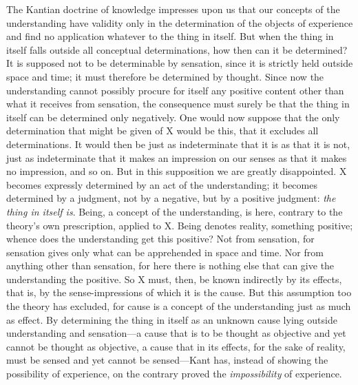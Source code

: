 \documentclass[12pt]{article}
\begin{document}
The Kantian doctrine of knowledge impresses upon us that our concepts of
the understanding have validity only in the determination of the objects of
experience and find no application whatever to the thing in itself. But
when the thing in itself falls outside all conceptual determinations, how
then can it be determined? It is supposed not to be determinable by
sensation, since it is strictly held outside space and time; it must
therefore be determined by thought. Since now the understanding cannot
possibly procure for itself any positive content other than what it
receives from sensation, the consequence must surely be that the thing in
itself can be determined only negatively. One would now suppose that the
only determination that might be given of X would be this, that it excludes
all determinations. It would then be just as indeterminate that it is as
that it is not, just as indeterminate that it makes an impression on our
senses as that it makes no impression, and so on. But in this supposition
we are greatly disappointed. X becomes expressly determined by an act of
the understanding; it becomes determined by a judgment, not by a negative,
but by a positive judgment: \emph{the thing in itself is}. Being, a concept
of the understanding, is here,
contrary to the theory's own prescription, applied to X. Being denotes
reality, something positive; whence does the understanding get this
positive? Not from sensation, for sensation gives only what can be
apprehended in space and time. Nor from anything other than sensation, for
here there is nothing else that can give the understanding the positive. So
X must, then, be known indirectly by its effects, that is, by the
sense-impressions of which it is the cause. But this assumption too the
theory has excluded, for cause is a concept of the understanding just as
much as effect. By determining the thing in itself as an unknown cause
lying outside understanding and sensation—a cause that is to be thought as
objective and yet cannot be thought as objective, a cause that in its
effects, for the sake of reality, must be sensed and yet cannot be
sensed—Kant has, instead of showing the possibility of experience, on the
contrary proved the \emph{impossibility} of experience.
\end{document}
